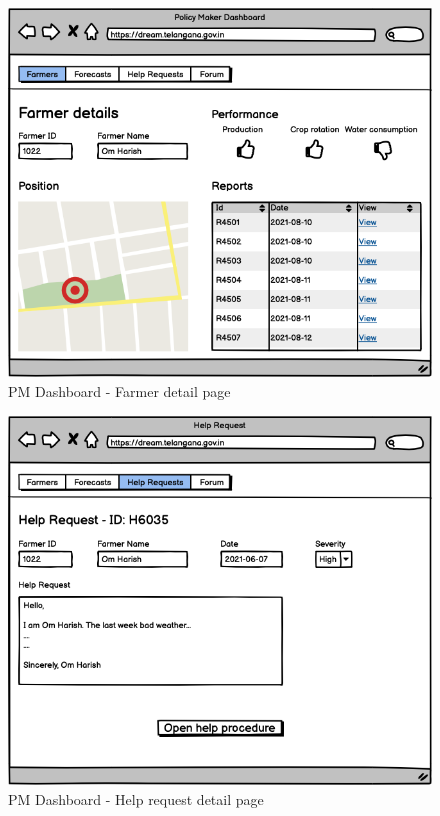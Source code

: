 \documentclass[10pt]{article}
\begin{document}
\begin{figure}[ht!]
    \centering
    \includegraphics[scale=0.40]{ui/pm_farmerdetail.png}
    \caption{PM Dashboard - Farmer detail page}
\end{figure}
\begin{figure}[ht!]
    \centering
    \includegraphics[scale=0.40]{ui/pm_helpdetail.png}
    \caption{PM Dashboard - Help request detail page}
\end{figure}
\end{document}
